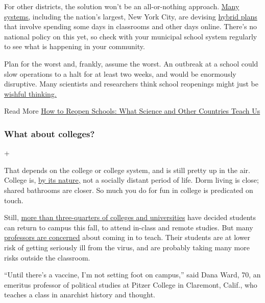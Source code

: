 For other districts, the solution won't be an all-or-nothing approach.
\href{https://bioethics.jhu.edu/research-and-outreach/projects/eschool-initiative/school-policy-tracker/}{Many
systems,} including the nation's largest, New York City, are devising
\href{https://www.nytimes.com/2020/06/26/us/coronavirus-schools-reopen-fall.html}{hybrid
plans} that involve spending some days in classrooms and other days
online. There's no national policy on this yet, so check with your
municipal school system regularly to see what is happening in your
community.

Plan for the worst and, frankly, assume the worst. An outbreak at a
school could slow operations to a halt for at least two weeks, and would
be enormously disruptive. Many scientists and researchers think school
reopenings might just be
\href{https://www.nytimes.com/2020/06/12/upshot/epidemiologists-decisions-children-school-coronavirus.html}{wishful
thinking.}

 Read More
\href{https://www.nytimes.com/2020/07/11/health/coronavirus-schools-reopen.html}{How
to Reopen Schools: What Science and Other Countries Teach Us}

\hypertarget{what-about-colleges}{%
\subsubsection{What about colleges?}\label{what-about-colleges}}

+

That depends on the college or college system, and is still pretty up in
the air. College is,
\href{https://www.nytimes.com/2020/06/15/opinion/coronavirus-college-safe.html}{by
its nature,} not a socially distant period of life. Dorm living is
close; shared bathrooms are closer. So much you do for fun in college is
predicated on touch.

Still,
\href{https://www.chronicle.com/article/Here-s-a-List-of-Colleges-/248626}{more
than three-quarters of colleges and universities} have decided students
can return to campus this fall, to attend in-class and remote studies.
But many
\href{https://www.nytimes.com/2020/07/03/us/coronavirus-college-professors.html}{professors
are concerned} about coming in to teach. Their students are at lower
risk of getting seriously ill from the virus, and are probably taking
many more risks outside the classroom.

``Until there's a vaccine, I'm not setting foot on campus,'' said Dana
Ward, 70, an emeritus professor of political studies at Pitzer College
in Claremont, Calif., who teaches a class in anarchist history and
thought.

